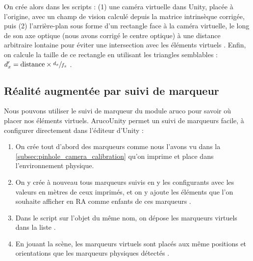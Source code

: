 On crée alors dans les scripts : (1) une caméra virtuelle dans Unity, placée à l'origine, avec un champ de vision calculé  depuis la matrice intrinsèque corrigée, puis (2) l'arrière-plan sous forme d'un rectangle face à la caméra virtuelle, le long de son axe optique (nous avons corrigé le centre optique) à une distance arbitraire lontaine pour éviter une intersection avec les éléments virtuels . Enfin, on calcule la taille de ce rectangle en utilisant les triangles semblables : $d_x' = \text{distance} \times \sfrac{d_x}{f_x}$ .

\subsection{Réalité augmentée par suivi de marqueur}
\label{subsec:pinhole_camera_tracker}




Nous pouvons utiliser le suivi de marqueur du module aruco pour savoir où placer nos éléments virtuels. ArucoUnity permet un suivi de marqueurs facile, à configurer directement dans l'éditeur d'Unity :
\begin{enumerate}
  \item On crée tout d'abord des marqueurs comme nous l'avons vu dans la \autoref{subsec:pinhole_camera_calibration} qu'on imprime et place dans l'environnement physique.
  \item On y crée à nouveau tous marqueurs suivis en y les configurants avec les valeurs en mètres de ceux imprimés, et on y ajoute les éléments que l'on souhaite afficher en RA comme enfants de ces marqueurs .
  \item Dans le script  sur l'objet du même nom, on dépose les marqueurs virtuels dans la liste  .
  \item En jouant la scène, les marqueurs virtuels sont placés aux même positions et orientations que les marqueurs physiques détectés .
\end{enumerate}

